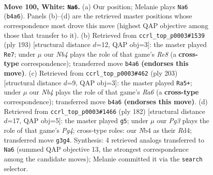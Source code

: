 \documentclass[11pt]{article}
\begin{document}
\begin{figure}[p]\centering
\begin{subfigure}{0.46\textwidth}\centering
\resizebox{\linewidth}{!}{%
\newchessgame
\chessboard[
  setfen={2R5/6p1/5p1k/7p/1N5P/6PK/4r3/8 w - - 24 100},
  showmover=false,
  pgfstyle=straightmove, color=movearrow, markmove={b4-a6}
]}
\caption{}
\end{subfigure}\hfill
\begin{subfigure}{0.46\textwidth}\centering
\resizebox{\linewidth}{!}{%
\newchessgame
\chessboard[
  setfen={8/8/6pk/7p/5K1P/3R1PP1/8/4r3 b - - 61 97},
  showmover=false,
  pgfstyle=straightmove, color=movearrow, markmove={e1-e7}
]}
\caption{}
\end{subfigure}
\\[4pt]
\begin{subfigure}{0.46\textwidth}\centering
\resizebox{\linewidth}{!}{%
\newchessgame
\chessboard[
  setfen={3R4/5pk1/7p/5K1P/5PP1/r7/8/8 b - - 10 102},
  showmover=false,
  pgfstyle=straightmove, color=movearrow, markmove={a3-a5}
]}
\caption{}
\end{subfigure}\hfill
\begin{subfigure}{0.46\textwidth}\centering
\resizebox{\linewidth}{!}{%
\newchessgame
\chessboard[
  setfen={8/5p2/4p1k1/4P3/3R1PPK/1r6/8/8 w - - 99 92},
  showmover=false,
  pgfstyle=straightmove, color=movearrow, markmove={g4-g5}
]}
\caption{}
\end{subfigure}
\caption{\textbf{Move 100, White: \texttt{Na6}.} (a) Our position; Melanie plays \texttt{Na6} (\texttt{b4a6}). Panels (b)--(d) are the retrieved master positions whose correspondence most drove this move (highest QAP objective among those that transfer to it). (b) Retrieved from \texttt{ccrl\_top\_p0003\#1539} (ply 193) [structural distance $d$=12, QAP obj=3]: the master played \texttt{Re7}; under $\mu$ our \emph{Nb4} plays the role of that game's \emph{Re8} (a \textbf{cross-type} correspondence); transferred move \texttt{b4a6} \textbf{(endorses this move)}. (c) Retrieved from \texttt{ccrl\_top\_p0003\#462} (ply 203) [structural distance $d$=9, QAP obj=3]: the master played \texttt{Ra5+}; under $\mu$ our \emph{Nb4} plays the role of that game's \emph{Ra6} (a \textbf{cross-type} correspondence); transferred move \texttt{b4a6} \textbf{(endorses this move)}. (d) Retrieved from \texttt{ccrl\_top\_p0003\#1466} (ply 182) [structural distance $d$=17, QAP obj=5]: the master played \texttt{g5}; under $\mu$ our \emph{Pg3} plays the role of that game's \emph{Pg4}; cross-type roles: our \emph{N}b4 as their \emph{R}d4; transferred move \texttt{g3g4}. Synthesis: 4 retrieved analogs transferred to \texttt{Na6} (summed QAP objective 13, the strongest correspondence among the candidate moves); Melanie committed it via the \texttt{search} selector.}
\label{fig:thought-m198}
\end{figure}
\end{document}
